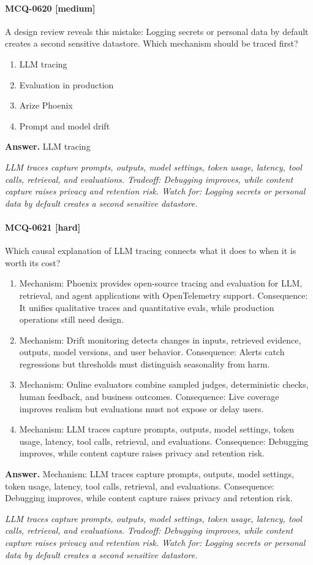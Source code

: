 \paragraph{MCQ-0620 [medium]} A design review reveals this mistake: Logging secrets or personal data by default creates a second sensitive datastore. Which mechanism should be traced first?
\begin{enumerate}[label=\Alph*.]
\item LLM tracing
\item Evaluation in production
\item Arize Phoenix
\item Prompt and model drift
\end{enumerate}
\noindent\textbf{Answer.} LLM tracing
\par\textit{LLM traces capture prompts, outputs, model settings, token usage, latency, tool calls, retrieval, and evaluations. Tradeoff: Debugging improves, while content capture raises privacy and retention risk. Watch for: Logging secrets or personal data by default creates a second sensitive datastore.}
\paragraph{MCQ-0621 [hard]} Which causal explanation of LLM tracing connects what it does to when it is worth its cost?
\begin{enumerate}[label=\Alph*.]
\item Mechanism: Phoenix provides open-source tracing and evaluation for LLM, retrieval, and agent applications with OpenTelemetry support. Consequence: It unifies qualitative traces and quantitative evals, while production operations still need design.
\item Mechanism: Drift monitoring detects changes in inputs, retrieved evidence, outputs, model versions, and user behavior. Consequence: Alerts catch regressions but thresholds must distinguish seasonality from harm.
\item Mechanism: Online evaluators combine sampled judges, deterministic checks, human feedback, and business outcomes. Consequence: Live coverage improves realism but evaluations must not expose or delay users.
\item Mechanism: LLM traces capture prompts, outputs, model settings, token usage, latency, tool calls, retrieval, and evaluations. Consequence: Debugging improves, while content capture raises privacy and retention risk.
\end{enumerate}
\noindent\textbf{Answer.} Mechanism: LLM traces capture prompts, outputs, model settings, token usage, latency, tool calls, retrieval, and evaluations. Consequence: Debugging improves, while content capture raises privacy and retention risk.
\par\textit{LLM traces capture prompts, outputs, model settings, token usage, latency, tool calls, retrieval, and evaluations. Tradeoff: Debugging improves, while content capture raises privacy and retention risk. Watch for: Logging secrets or personal data by default creates a second sensitive datastore.}
